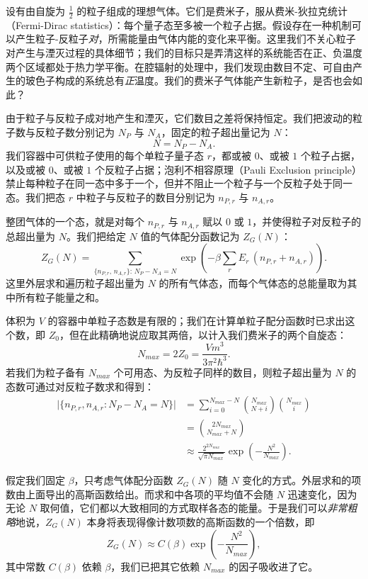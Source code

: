 设有由自旋为 $\tfrac12$ 的粒子组成的理想气体。它们是费米子，服从费米-狄拉克统计（Fermi-Dirac statistics）：每个量子态至多被一个粒子占据。假设存在一种机制可以产生粒子-反粒子\emph{对}，所需能量由气体内能的变化来平衡。这里我们不关心粒子对产生与湮灭过程的具体细节；我们的目标只是弄清这样的系统能否在正、负温度两个区域都处于热力学平衡。在腔辐射的处理中，我们发现由数目不定、可自由产生的玻色子构成的系统总有\emph{正}温度。我们的费米子气体能产生新粒子，是否也会如此？

由于粒子与反粒子成对地产生和湮灭，它们数目之差将保持恒定。我们把波动的粒子数与反粒子数分别记为 $N_{P}$ 与 $N_{A}$，固定的粒子超出量记为 $N$：
\begin{equation}
N=N_{P}-N_{A}.
\end{equation}
我们容器中可供粒子使用的每个单粒子量子态 $r$，都或被 $0$、或被 $1$ 个粒子占据，以及或被 $0$、或被 $1$ 个反粒子占据；泡利不相容原理（Pauli Exclusion principle）禁止每种粒子在同一态中多于一个，但并不阻止一个粒子与一个反粒子处于同一态。我们把态 $r$ 中粒子与反粒子的数目分别记为 $n_{P,r}$ 与 $n_{A,r}$。

整团气体的一个态，就是对每个 $n_{P,r}$ 与 $n_{A,r}$ 赋以 $0$ 或 $1$，并使得粒子对反粒子的总超出量为 $N$。我们把给定 $N$ 值的气体配分函数记为 $Z_{G}(N)$：
\begin{equation}
Z_{G}(N)=\sum_{\{n_{P,r},\,n_{A,r}\}:\,N_{P}-N_{A}=N}
\exp\!\left(-\beta\sum_{r}E_{r}\,(n_{P,r}+n_{A,r})\right).
\end{equation}
这里外层求和遍历粒子超出量为 $N$ 的所有气体态，而每个气体态的总能量取为其中所有粒子能量之和。

体积为 $V$ 的容器中单粒子态数是有限的；我们在计算单粒子配分函数时已求出这个数，即 $Z_{0}$，但在此精确地说应取其两倍，以计入我们费米子的两个自旋态：
\begin{equation}
N_{max}=2Z_{0}=\frac{Vm^{3}}{3\pi^{2}\hbar^{3}}.
\end{equation}
若我们为粒子备有 $N_{max}$ 个可用态、为反粒子同样的数目，则粒子超出量为 $N$ 的态数可通过对反粒子数求和得到：
\begin{align}
\bigl|\{n_{P,r},n_{A,r}:N_{P}-N_{A}=N\}\bigr|
&=\sum_{i=0}^{N_{max}-N}\binom{N_{max}}{N+i}\binom{N_{max}}{i} \nonumber\\
&=\binom{2N_{max}}{N_{max}+N} \nonumber\\
&\approx\frac{2^{2N_{max}}}{\sqrt{\pi N_{max}}}\exp\!\left(-\frac{N^{2}}{N_{max}}\right).
\end{align}

假定我们固定 $\beta$，只考虑气体配分函数 $Z_{G}(N)$ 随 $N$ 变化的方式。外层求和的项数由上面导出的高斯函数给出。而求和中各项的平均值不会随 $N$ 迅速变化，因为无论 $N$ 取何值，它们都以大致相同的方式取样各态的能量。于是我们可以\emph{非常粗略}地说，$Z_{G}(N)$ 本身将表现得像计数项数的高斯函数的一个倍数，即
\begin{equation}
Z_{G}(N)\approx C(\beta)\exp\!\left(-\frac{N^{2}}{N_{max}}\right),
\end{equation}
其中常数 $C(\beta)$ 依赖 $\beta$，我们已把其它依赖 $N_{max}$ 的因子吸收进了它。

